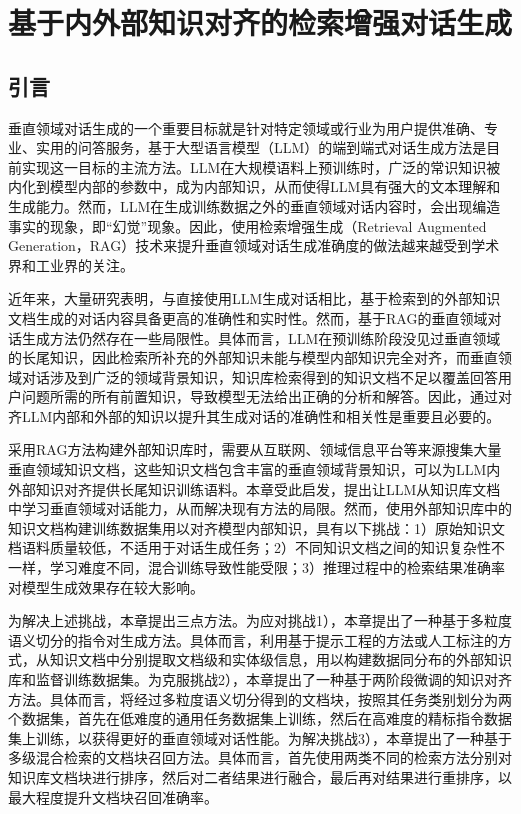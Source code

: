 \chapter{基于内外部知识对齐的检索增强对话生成}

\section{引言}

垂直领域对话生成的一个重要目标就是针对特定领域或行业为用户提供准确、专业、实用的问答服务，基于大型语言模型（LLM）的端到端式对话生成方法是目前实现这一目标的主流方法。LLM在大规模语料上预训练时，广泛的常识知识被内化到模型内部的参数中，成为内部知识，从而使得LLM具有强大的文本理解和生成能力。然而，LLM在生成训练数据之外的垂直领域对话内容时，会出现编造事实的现象，即“幻觉”现象。因此，使用检索增强生成（Retrieval Augmented Generation，RAG）\cite{DBLP:conf/nips/LewisPPPKGKLYR020}技术来提升垂直领域对话生成准确度的做法越来越受到学术界和工业界的关注。

近年来，大量研究\cite{DBLP:conf/nips/LewisPPPKGKLYR020,DBLP:journals/corr/abs-2312-10997}表明，与直接使用LLM生成对话相比，基于检索到的外部知识文档生成的对话内容具备更高的准确性和实时性。然而，基于RAG的垂直领域对话生成方法仍然存在一些局限性。具体而言，LLM在预训练阶段没见过垂直领域的长尾知识，因此检索所补充的外部知识未能与模型内部知识完全对齐，而垂直领域对话涉及到广泛的领域背景知识，知识库检索得到的知识文档不足以覆盖回答用户问题所需的所有前置知识，导致模型无法给出正确的分析和解答。因此，通过对齐LLM内部和外部的知识以提升其生成对话的准确性和相关性是重要且必要的。

采用RAG方法构建外部知识库时，需要从互联网、领域信息平台等来源搜集大量垂直领域知识文档，这些知识文档包含丰富的垂直领域背景知识，可以为LLM内外部知识对齐提供长尾知识训练语料。本章受此启发，提出让LLM从知识库文档中学习垂直领域对话能力，从而解决现有方法的局限。然而，使用外部知识库中的知识文档构建训练数据集用以对齐模型内部知识，具有以下挑战：1）原始知识文档语料质量较低，不适用于对话生成任务；2）不同知识文档之间的知识复杂性不一样，学习难度不同，混合训练导致性能受限；3）推理过程中的检索结果准确率对模型生成效果存在较大影响。

为解决上述挑战，本章提出三点方法。为应对挑战1），本章提出了一种基于多粒度语义切分的指令对生成方法。具体而言，利用基于提示工程的方法或人工标注的方式，从知识文档中分别提取文档级和实体级信息，用以构建数据同分布的外部知识库和监督训练数据集。为克服挑战2），本章提出了一种基于两阶段微调的知识对齐方法。具体而言，将经过多粒度语义切分得到的文档块，按照其任务类别划分为两个数据集，首先在低难度的通用任务数据集上训练，然后在高难度的精标指令数据集上训练，以获得更好的垂直领域对话性能。为解决挑战3），本章提出了一种基于多级混合检索的文档块召回方法。具体而言，首先使用两类不同的检索方法分别对知识库文档块进行排序，然后对二者结果进行融合，最后再对结果进行重排序，以最大程度提升文档块召回准确率。

